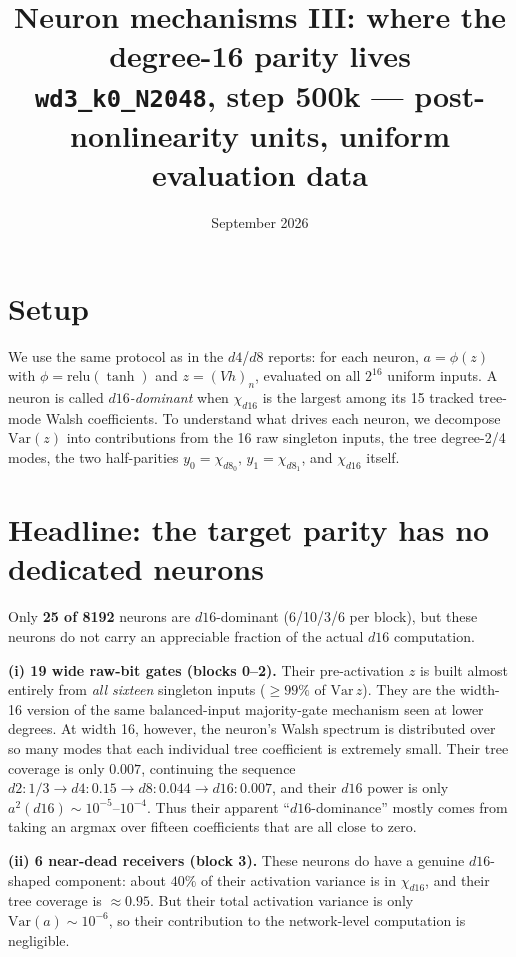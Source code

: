 \documentclass[10pt]{article}
\title{\vspace{-1.2cm}Neuron mechanisms III: where the degree-16 parity lives\\
\large \texttt{wd3\_k0\_N2048}, step 500k --- post-nonlinearity units, uniform evaluation data}
\author{}\date{September 2026}
\begin{document}
\maketitle\vspace{-1.4cm}

\section*{Setup}
We use the same protocol as in the $d4$/$d8$ reports: for each neuron,
$a=\phi(z)$ with $\phi=\mathrm{relu}(\tanh)$ and $z=(Vh)_n$, evaluated on all
$2^{16}$ uniform inputs. A neuron is called \emph{$d16$-dominant} when
$\chi_{d16}$ is the largest among its 15 tracked tree-mode Walsh coefficients.
To understand what drives each neuron, we decompose $\mathrm{Var}(z)$ into
contributions from the 16 raw singleton inputs, the tree degree-2/4 modes, the two
half-parities $y_0=\chi_{d8_0},\,y_1=\chi_{d8_1}$, and $\chi_{d16}$ itself.

\section*{Headline: the target parity has no dedicated neurons}
Only \textbf{25 of 8192} neurons are $d16$-dominant (6/10/3/6 per block), but
these neurons do not carry an appreciable fraction of the actual $d16$
computation.

\textbf{(i) 19 wide raw-bit gates (blocks 0--2).} Their pre-activation $z$ is built
almost entirely from \emph{all sixteen} singleton inputs ($\geq99\%$ of
$\mathrm{Var}\,z$). They are the width-16 version of the same balanced-input
majority-gate mechanism seen at lower degrees. At width 16, however, the neuron's
Walsh spectrum is distributed over so many modes that each individual tree
coefficient is extremely small. Their tree coverage is only $0.007$, continuing
the sequence
$d2\!:\!1/3 \to d4\!:\!0.15 \to d8\!:\!0.044 \to d16\!:\!0.007$, and their
$d16$ power is only $a^2(d16)\sim10^{-5}$--$10^{-4}$. Thus their apparent
``$d16$-dominance'' mostly comes from taking an argmax over fifteen coefficients
that are all close to zero.

\textbf{(ii) 6 near-dead receivers (block 3).} These neurons do have a genuine
$d16$-shaped component: about $40\%$ of their activation variance is in
$\chi_{d16}$, and their tree coverage is $\approx0.95$. But their total activation
variance is only $\mathrm{Var}(a)\sim10^{-6}$, so their contribution to the
network-level computation is negligible.
\end{document}
